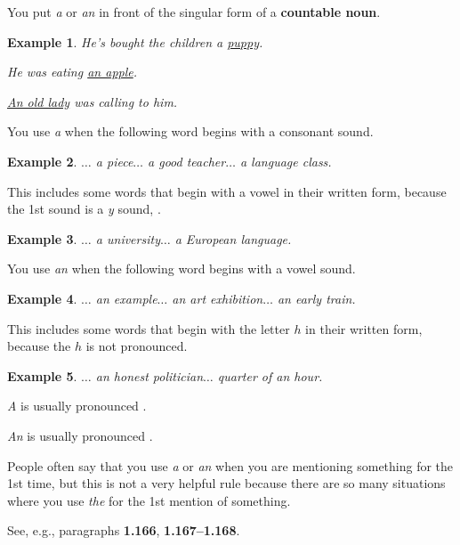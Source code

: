\documentclass[oneside]{book}
\numberwithin{equation}{section}
\newtheorem{example}{Example}[section]
\begin{document}
You put \textit{a} or \textit{an} in front of the singular form of a \textbf{countable noun}.
\begin{example}
    He's bought the children a \underline{puppy}.
    
    He was eating \underline{an apple}.
    
    \underline{An old lady} was calling to him. 
\end{example}
%
\noindent{} You use \textit{a} when the following word begins with a consonant sound.
\begin{example}
    $\ldots$ a piece$\ldots$ a good teacher$\ldots$ a language class.
\end{example}
This includes some words that begin with a vowel in their written form, because the 1st sound is a \textit{y} sound, .
\begin{example}
    $\ldots$ a university$\ldots$ a European language.
\end{example}
You use \textit{an} when the following word begins with a vowel sound.
\begin{example}
    $\ldots$ an example$\ldots$ an art exhibition$\ldots$ an early train.
\end{example}
This includes some words that begin with the letter $h$ in their written form, because the $h$ is not pronounced.
\begin{example}
    $\ldots$ an honest politician$\ldots$ quarter of an hour.
\end{example}
\textit{A} is usually pronounced .

\textit{An} is usually pronounced .

%
\noindent{} People often say that you use \textit{a} or \textit{an} when you are mentioning something for the 1st time, but this is not a very helpful rule because there are so many situations where you use \textit{the} for the 1st mention of something.

See, e.g., paragraphs \textbf{1.166}, \textbf{1.167--1.168}.
\end{document}

